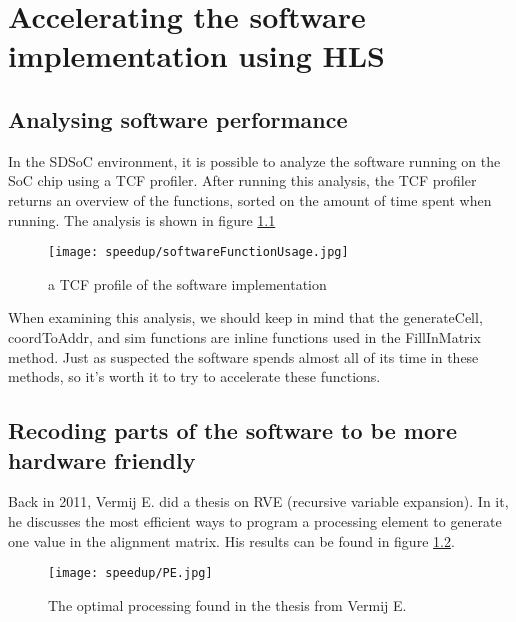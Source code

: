 
\chapter{Accelerating the software implementation using HLS}

\section{Analysing software performance}

In the SDSoC environment, it is possible to analyze the software running on the SoC chip using a TCF profiler. After running this analysis, the TCF profiler returns an overview of the functions, sorted on the amount of time spent when running. The analysis is shown in figure \ref{fig:softwareFunctionUsage}

\begin{figure}[H]
	\centering
	\texttt{[image: speedup/softwareFunctionUsage.jpg]}
	\caption{a TCF profile of the software implementation}
	\label{fig:softwareFunctionUsage}
\end{figure}

When examining this analysis, we should keep in mind that the generateCell, coordToAddr, and sim functions are inline functions used in the FillInMatrix method. Just as suspected the software spends almost all of its time in these methods, so it's worth it to try to accelerate these functions.

\section{Recoding parts of the software to be more hardware friendly}

Back in 2011, Vermij E. did a thesis on RVE (recursive variable expansion). In it, he discusses the most efficient ways to program a processing element to generate one value in the alignment matrix. His results can be found in figure \ref{fig:PE}. 

\begin{figure}[H]
	\centering
	\texttt{[image: speedup/PE.jpg]}
	\caption{The optimal processing found in the thesis from Vermij E.}
	\label{fig:PE}
\end{figure}

